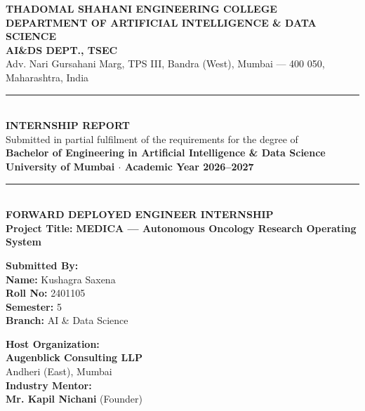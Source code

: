 \documentclass[11pt,a4paper]{article}
\begin{document}
\begin{titlepage}
    \centering
    \vspace*{0.2cm}
    
    {\Large \textbf{THADOMAL SHAHANI ENGINEERING COLLEGE}}\\[0.2cm]
    {\large \textbf{DEPARTMENT OF ARTIFICIAL INTELLIGENCE \& DATA SCIENCE}}\\[0.1cm]
    {\normalsize \textbf{AI\&DS DEPT., TSEC}}\\[0.1cm]
    {\small Adv. Nari Gursahani Marg, TPS III, Bandra (West), Mumbai --- 400 050, Maharashtra, India}\\[1.5cm]
    
    \rule{\linewidth}{1.0pt}\\[0.3cm]
    {\Large \textbf{INTERNSHIP REPORT}}\\[0.15cm]
    {\normalsize Submitted in partial fulfilment of the requirements for the degree of}\\[0.15cm]
    {\large \textbf{Bachelor of Engineering in Artificial Intelligence \& Data Science}}\\[0.1cm]
    {\normalsize \textbf{University of Mumbai $\cdot$ Academic Year 2026--2027}}\\[0.3cm]
    \rule{\linewidth}{1.0pt}\\[1.5cm]
    
    {\large \textbf{FORWARD DEPLOYED ENGINEER INTERNSHIP}}\\[0.2cm]
    {\normalsize \textbf{Project Title:} \textbf{MEDICA --- Autonomous Oncology Research Operating System}}\\[1.5cm]
    
    \begin{minipage}{0.48\textwidth}
        \textbf{Submitted By:}\\[0.15cm]
        \textbf{Name:} Kushagra Saxena\\
        \textbf{Roll No:} 2401105\\
        \textbf{Semester:} 5\\
        \textbf{Branch:} AI \& Data Science
    \end{minipage}
    \hfill
    \begin{minipage}{0.48\textwidth}
        \begin{flushright}
            \textbf{Host Organization:}\\[0.15cm]
            \textbf{Augenblick Consulting LLP}\\
            Andheri (East), Mumbai\\
            \textbf{Industry Mentor:}\\
            \textbf{Mr. Kapil Nichani} (Founder)
        \end{flushright}
    \end{minipage}


\end{titlepage}
\end{document}
